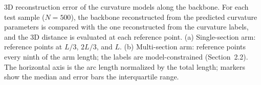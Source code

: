 \caption{3D reconstruction error of the curvature models along the backbone. For each test sample ($N = 500$), the backbone reconstructed from the predicted curvature parameters is compared with the one reconstructed from the curvature labels, and the 3D distance is evaluated at each reference point. (a) Single-section arm: reference points at $L/3$, $2L/3$, and $L$. (b) Multi-section arm: reference points every ninth of the arm length; the labels are model-constrained (Section~2.2). The horizontal axis is the arc length normalized by the total length; markers show the median and error bars the interquartile range.}
